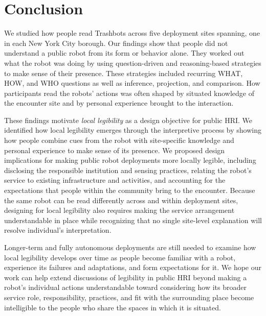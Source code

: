 \section{Conclusion}
\label{sec:conclusion}

We studied how people read Trashbots across five deployment sites spanning, one in each New York City borough. Our findings show that people did not understand a public robot from its form or behavior alone. They worked out what the robot was doing by using question-driven and reasoning-based strategies to make sense of their presence. These strategies included recurring WHAT, HOW, and WHO questions as well as inference, projection, and comparison. How participants read the robots' actions was often shaped by situated knowledge of the encounter site and by personal experience brought to the interaction.

These findings motivate \emph{local legibility} as a design objective for public HRI. We identified how local legibility emerges through the interpretive process by showing how people combine cues from the robot with site-specific knowledge and personal experience to make sense of its presence. We proposed design implications for making public robot deployments more locally legible, including disclosing the responsible institution and sensing practices, relating the robot's service to existing infrastructure and activities, and accounting for the expectations that people within the community bring to the encounter. Because the same robot can be read differently across and within deployment sites, designing for local legibility also requires making the service arrangement understandable in place while recognizing that no single site-level explanation will resolve individual's interpretation.

Longer-term and fully autonomous deployments are still needed to examine how local legibility develops over time as people become familiar with a robot, experience its failures and adaptations, and form expectations for it. We hope our work can help extend discussions of legibility in public HRI beyond making a robot's individual actions understandable toward considering how its broader service role, responsibility, practices, and fit with the surrounding place become intelligible to the people who share the spaces in which it is situated.